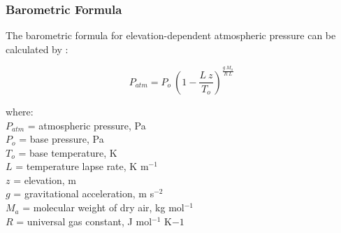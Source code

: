 \subsubsection{Barometric Formula}
\label{sec:atm}
The barometric formula for elevation-dependent atmospheric pressure can be calculated by \parencite{berberansantos97}:

\begin{equation}
\label{eq:atm}
	P_{atm} = P_o \: \left(1 - \frac{L \: z}{T_o}\right)^{\frac{g\: M_a}{R\: L}}
\end{equation}

\noindent where: \\
\indent $P_{atm}$ = atmospheric pressure, Pa \\
\indent $P_o$ = base pressure, Pa \\
\indent $T_o$ = base temperature, K \\
\indent $L$ = temperature lapse rate, K m$^{-1}$ \\
\indent $z$ = elevation, m \\
\indent $g$ = gravitational acceleration, m s$^{-2}$ \\
\indent $M_a$ = molecular weight of dry air, kg mol$^{-1}$ \\
\indent $R$ = universal gas constant, J mol$^{-1}$ K${-1}$ \\

